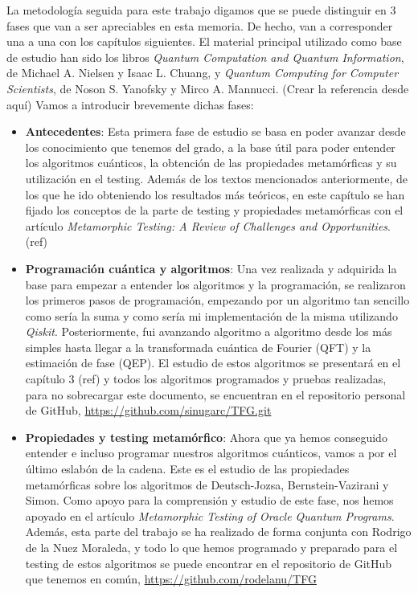 La metodología seguida para este trabajo digamos que se puede distinguir en 3 fases que van a ser apreciables en esta memoria. De hecho, van a corresponder una a una con los capítulos siguientes. El material principal utilizado como base de estudio han sido los libros \textit{Quantum Computation and Quantum Information}, de Michael A. Nielsen y Isaac L. Chuang, y \textit{Quantum Computing for Computer Scientists}, de Noson S. Yanofsky y Mirco A. Mannucci. (Crear la referencia desde aquí) Vamos a introducir brevemente dichas fases: 

\begin{itemize}
    \item \textbf{Antecedentes}: Esta primera fase de estudio se basa en poder avanzar desde los conocimiento que tenemos del grado, a la base útil para poder entender los algoritmos cuánticos, la obtención de las propiedades metamórficas y su utilización en el testing. Además de los textos mencionados anteriormente, de los que he ido obteniendo los resultados más teóricos, en este capítulo se han fijado los conceptos de la parte de testing y propiedades metamórficas con el artículo \textit{Metamorphic Testing: A Review of Challenges and Opportunities}.(ref)
    
    \item \textbf{Programación cuántica y algoritmos}: Una vez realizada y adquirida la base para empezar a entender los algoritmos y la programación, se realizaron los primeros pasos de programación, empezando por un algoritmo tan sencillo como sería la suma y como sería mi implementación de la misma utilizando \textit{Qiskit}. Posteriormente, fui avanzando algoritmo a algoritmo desde los más simples hasta llegar a la transformada cuántica de Fourier (QFT) y la estimación de fase (QEP). El estudio de estos algoritmos se presentará en el capítulo 3 (ref) y todos los algoritmos programados y pruebas realizadas, para no sobrecargar este documento, se encuentran en el repositorio personal de GitHub, \url{https://github.com/sinugarc/TFG.git}
    
    \item \textbf{Propiedades y testing metamórfico}: Ahora que ya hemos conseguido entender e incluso programar nuestros algoritmos cuánticos, vamos a por el último eslabón de la cadena. Este es el estudio de las propiedades metamórficas sobre los algoritmos de Deutsch-Jozsa, Bernstein-Vazirani y Simon. Como apoyo para la comprensión y estudio de este fase, nos hemos apoyado en el artículo \textit{Metamorphic Testing of Oracle Quantum Programs}. Además, esta parte del trabajo se ha realizado de forma conjunta con Rodrigo de la Nuez Moraleda, y todo lo que hemos programado y preparado para el testing de estos algoritmos se puede encontrar en el repositorio de GitHub que tenemos en común, \url{https://github.com/rodelanu/TFG}
\end{itemize}

